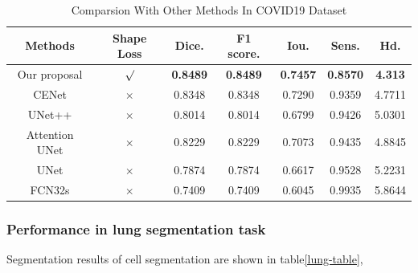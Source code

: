 \documentclass[UTF8]{article} %
\begin{document}
  \begin{table}[H]
    \vspace{-2mm}
    \begin{center}\small
    \caption{Comparsion With Other Methods In COVID19\cite{covid19_2} Dataset}
    \label{covid19-table}
    \begin{tabular}{ccccccc}
      
    \toprule
    Methods & Shape Loss & Dice. & F1 score. & Iou. & Sens. & Hd.\\
    \midrule
      Our proposal & $\surd$ & \textbf{0.8489} & \textbf{0.8489} & \textbf{0.7457} & \textbf{0.8570} & \textbf{4.313}\\
      CENet & $\times$ & 0.8348 & 0.8348 & 0.7290 & 0.9359 & 4.7711\\
      UNet++ & $\times$ & 0.8014 & 0.8014 & 0.6799 & 0.9426 & 5.0301\\
      Attention UNet & $\times$ & 0.8229 & 0.8229 & 0.7073 & 0.9435 & 4.8845\\
      UNet  & $\times$ & 0.7874 & 0.7874 & 0.6617 & 0.9528 & 5.2231\\
      FCN32s & $\times$ & 0.7409 & 0.7409 & 0.6045 & 0.9935 & 5.8644\\
  \bottomrule    
    \end{tabular}
    \end{center}
    \vspace{-4mm}
  \end{table}

  \subsubsection{Performance in lung segmentation task}
  Segmentation results of cell segmentation are shown in table\ref{lung-table}, 
    
\end{document}
